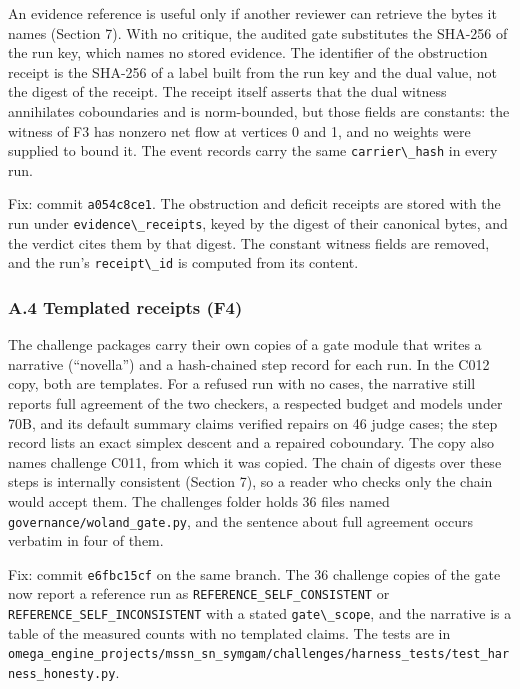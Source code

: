 \documentclass[
  11pt,
]{article}
\newcommand{\passthrough}[1]{#1}
\begin{document}
An evidence reference is useful only if another reviewer can retrieve
the bytes it names (Section 7). With no critique, the audited gate
substitutes the SHA-256 of the run key, which names no stored evidence.
The identifier of the obstruction receipt is the SHA-256 of a label
built from the run key and the dual value, not the digest of the
receipt. The receipt itself asserts that the dual witness annihilates
coboundaries and is norm-bounded, but those fields are constants: the
witness of F3 has nonzero net flow at vertices 0 and 1, and no weights
were supplied to bound it. The event records carry the same
\passthrough{\lstinline!carrier\_hash!} in every run.

Fix: commit \passthrough{\lstinline!a054c8ce1!}. The obstruction and
deficit receipts are stored with the run under
\passthrough{\lstinline!evidence\_receipts!}, keyed by the digest of
their canonical bytes, and the verdict cites them by that digest. The
constant witness fields are removed, and the run's
\passthrough{\lstinline!receipt\_id!} is computed from its content.

\subsubsection{A.4 Templated receipts
(F4)}\label{a.4-templated-receipts-f4}

The challenge packages carry their own copies of a gate module that
writes a narrative (``novella'') and a hash-chained step record for each
run. In the C012 copy, both are templates. For a refused run with no
cases, the narrative still reports full agreement of the two checkers, a
respected budget and models under 70B, and its default summary claims
verified repairs on 46 judge cases; the step record lists an exact
simplex descent and a repaired coboundary. The copy also names challenge
C011, from which it was copied. The chain of digests over these steps is
internally consistent (Section 7), so a reader who checks only the chain
would accept them. The challenges folder holds 36 files named
\nolinkurl{governance/woland_gate.py}, and the sentence about full
agreement occurs verbatim in four of them.

Fix: commit \passthrough{\lstinline!e6fbc15cf!} on the same branch. The
36 challenge copies of the gate now report a reference run as
\nolinkurl{REFERENCE_SELF_CONSISTENT} or
\nolinkurl{REFERENCE_SELF_INCONSISTENT} with a stated
\passthrough{\lstinline!gate\_scope!}, and the narrative is a table of
the measured counts with no templated claims. The tests are in
\nolinkurl{omega_engine_projects/mssn_sn_symgam/challenges/harness_tests/test_harness_honesty.py}.
\end{document}
